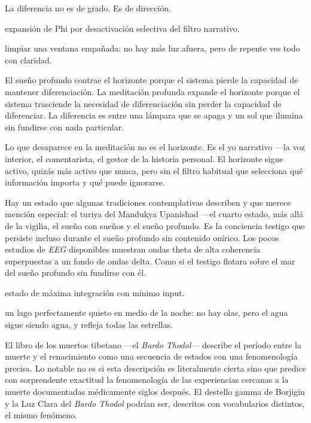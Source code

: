 La diferencia no es de grado. Es de dirección.

\begin{fisica}
 expansión de Phi por desactivación selectiva del filtro narrativo.

 limpiar una ventana empañada: no hay más luz afuera, pero de repente ves todo con claridad.
\end{fisica}
El sueño profundo contrae el horizonte porque el sistema pierde la capacidad de mantener diferenciación. La meditación profunda expande el horizonte porque el sistema trasciende la necesidad de diferenciación sin perder la capacidad de diferenciar. La diferencia es entre una lámpara que se apaga y un sol que ilumina sin fundirse con nada particular.

Lo que desaparece en la meditación no es el horizonte. Es el yo narrativo —la voz interior, el comentarista, el gestor de la historia personal. El horizonte sigue activo, quizás más activo que nunca, pero sin el filtro habitual que selecciona qué información importa y qué puede ignorarse.

Hay un estado que algunas tradiciones contemplativas describen y que merece mención especial: el turiya del Mandukya Upanishad —el cuarto estado, más allá de la vigilia, el sueño con sueños y el sueño profundo. Es la conciencia testigo que persiste incluso durante el sueño profundo sin contenido onírico. Los pocos estudios de \emph{EEG} disponibles muestran ondas theta de alta coherencia superpuestas a un fondo de ondas delta. Como si el testigo flotara sobre el mar del sueño profundo sin fundirse con él.

\begin{fisica}
 estado de máxima integración con mínimo input.

 un lago perfectamente quieto en medio de la noche: no hay olas, pero el agua sigue siendo agua, y refleja todas las estrellas.
\end{fisica}
El libro de los muertos tibetano —el \emph{Bardo Thodol}— describe el período entre la muerte y el renacimiento como una secuencia de estados con una fenomenología precisa. Lo notable no es si esta descripción es literalmente cierta sino que predice con sorprendente exactitud la fenomenología de las experiencias cercanas a la muerte documentadas médicamente siglos después. El destello gamma de Borjigin y la Luz Clara del \emph{Bardo Thodol} podrían ser, descritos con vocabularios distintos, el mismo fenómeno.

